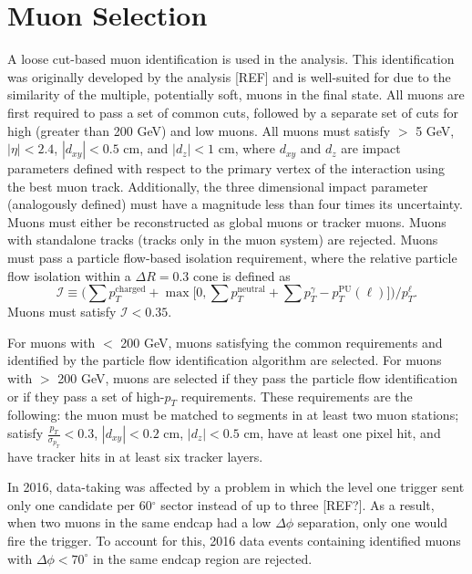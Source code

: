 \section{Muon Selection}
A loose cut-based muon identification is used in the analysis. This identification was originally developed by the \hzz 
analysis [REF] and is well-suited for \hzg due to the similarity of the multiple, potentially soft, muons in the final state. 
All muons are first required to pass a set of common cuts, followed by a separate set of cuts for high \pt (greater than 200 GeV) 
and low \pt muons. All muons must satisfy \pt $>$ 5 GeV, $|\eta| < 2.4$, $|d_{xy}| < 0.5$ cm, and $|d_{z}| < 1$ cm, where $d_{xy}$ and 
$d_{z}$ are impact parameters defined with respect to the primary vertex of the interaction using the best muon track. 
Additionally, the three dimensional impact parameter (analogously defined) must have a magnitude less than four times its uncertainty.
Muons must either be reconstructed as global muons or tracker muons. Muons with standalone tracks (tracks only in the muon system) are
rejected. Muons must pass a particle flow-based isolation requirement, where the relative particle flow isolation 
within a $\Delta R = 0.3$ cone is defined as 
\begin{equation}
\label{eqn:pfiso}
	\mathcal{I} \equiv \Big( \sum p_{T}^\text{charged} + \max\big[ 0, \sum p_{T}^\text{neutral} +\sum p_{T}^{\gamma} - p_{T}^\mathrm{PU}(\ell) \big] \Big) / p_{T}^{\ell}.
\end{equation}
Muons must satisfy $\mathcal{I} < 0.35$. 

For muons with \pt $<$ 200 GeV, muons satisfying the common requirements and identified by the particle flow identification
algorithm are selected. For muons with \pt $>$ 200 GeV, muons are selected if they pass the particle flow identification or if they pass
a set of high-$p_{T}$ requirements. These requirements are the following: the muon must be matched to segments in at least two muon 
stations; satisfy $\frac{p_{T}}{\sigma_{p_{T}}} < 0.3$, $|d_{xy}| < 0.2$ cm, $|d_{z}| < 0.5$ cm, have at least one pixel hit, and have 
tracker hits in at least six tracker layers.

In 2016, data-taking was affected by a problem in which the level one trigger sent only one candidate per 60$^{\circ}$ sector instead 
of up to three [REF?]. As a result, when two muons in the same endcap had a low $\Delta \phi$ separation, only one would fire the 
trigger. To account for this, 2016 data events containing identified muons with $\Delta \phi < 70^{\circ}$ in the same endcap region 
are rejected. 

